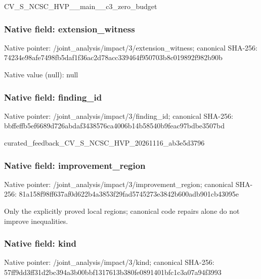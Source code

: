 \documentclass[10pt,a4paper]{article}
\begin{document}
\begingroup\raggedright\sloppy CV\_\allowbreak{}S\_\allowbreak{}NCSC\_\allowbreak{}HVP\_\allowbreak{}\_\allowbreak{}main\_\allowbreak{}\_\allowbreak{}c3\_\allowbreak{}zero\_\allowbreak{}budget\par\endgroup

\subsubsection{Native field: extension\_\allowbreak{}witness}
Native pointer: /joint\_\allowbreak{}analysis/impact/3/extension\_\allowbreak{}witness; canonical SHA-256: 74234e98afe7498fb5daf1f36ac2d78acc339464f950703b8c019892f982b90b

Native value (null): null

\subsubsection{Native field: finding\_\allowbreak{}id}
Native pointer: /joint\_\allowbreak{}analysis/impact/3/finding\_\allowbreak{}id; canonical SHA-256: bbffeffb5ef6689d726abdaf3438576ca4006b14b58540b9feac97bdbe3507bd

\begingroup\raggedright\sloppy curated\_\allowbreak{}feedback\_\allowbreak{}CV\_\allowbreak{}S\_\allowbreak{}NCSC\_\allowbreak{}HVP\_\allowbreak{}20261116\_\allowbreak{}ab3e5d3796\par\endgroup

\subsubsection{Native field: improvement\_\allowbreak{}region}
Native pointer: /joint\_\allowbreak{}analysis/impact/3/improvement\_\allowbreak{}region; canonical SHA-256: 81a158f98ff637af0d622b4a3853f29fad5745273e3842b600adb901cb43095e

\begingroup\raggedright\sloppy Only the explicitly proved local regions;\allowbreak{} canonical code repairs alone do not improve inequalities.\par\endgroup

\subsubsection{Native field: kind}
Native pointer: /joint\_\allowbreak{}analysis/impact/3/kind; canonical SHA-256: 57ff9dd3ff31d2bc394a3b00bbf1317613b380fe0891401bfc1c3a07a94f3993
\end{document}
